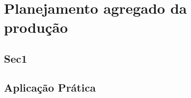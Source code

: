 \chapter{Planejamento agregado da produção} 
\label{chap:planejamento_agregado} 

\section{Sec1} 
\label{sec:planejamento_agregado_sec1} 
 
\section{Aplicação Prática} 
\label{sec:planejamento_agregado_aplicacao}
